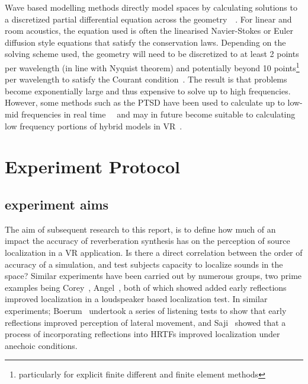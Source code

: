 \documentclass[paper=a4, fontsize=10pt, font=arial]{scrartcl} %
\numberwithin{equation}{section} %
\numberwithin{figure}{section} %
\numberwithin{table}{section} %
\begin{document}
Wave based modelling methods directly model spaces by calculating solutions to a discretized partial differential equation across the geometry~\cite{Botteldooren1995}~\cite{Bilbao2013}. For linear and room acoustics, the equation used is often the linearised Navier-Stokes or Euler diffusion style equations that satisfy the conservation laws. Depending on the solving scheme used, the geometry will need to be discretized to at least 2 points per wavelength (in line with Nyquist theorem) and potentially beyond 10 points\footnote{particularly for explicit finite different and finite element methods} per wavelength to satisfy the Courant condition~\cite{Siltanen2013}. The result is that problems become exponentially large and thus expensive to solve up to high frequencies. However, some methods such as the PTSD have been used to calculate up to low-mid frequencies in real time~\cite{Angus2010}~\cite{Savioja2010} and may in future become suitable to calculating low frequency portions of hybrid models in VR~\cite{Southern2012}.

\newpage
\section{Experiment Protocol}
\subsection{experiment aims}
The aim of subsequent research to this report, is to define how much of an impact the accuracy of reverberation synthesis has on the perception of source localization in a VR application. Is there a direct correlation between the order of accuracy of a simulation, and test subjects capacity to localize sounds in the space? Similar experiments have been carried out by numerous groups, two prime examples being Corey~\cite{Corey2002}, Angel~\cite{Angel2002}, both of which showed added early reflections improved localization in a loudspeaker based localization test. In similar experiments; Boerum~\cite{Boerum2016} undertook a series of listening tests to show that early reflections improved perception of lateral movement, and Saji~\cite{Saji2009} showed that a process of incorporating reflections into HRTFs improved localization under anechoic conditions.
\end{document}
